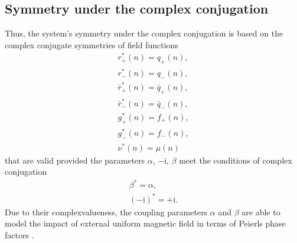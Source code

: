 \documentclass[10pt,a4paper]{amsart}
\numberwithin{equation}{section}
\begin{document}
\subsection{Symmetry under the complex conjugation}
Thus, the system's symmetry under the complex conjugation is based on the complex conjugate symmetries of field functions
\begin{gather}\label{eq-6.15}
	 r^{*}_{+}(n)=q_{+}(n),
\\ \label{eq-6.16}
	 r^{*}_{-}(n)=q_{-}(n),
\\ \label{eq-6.17}
	 \bar{r}^{*}_{+}(n)=\bar{q}_{+}(n),
\\ \label{eq-6.18}
	 \bar{r}^{*}_{-}(n)=\bar{q}_{-}(n),
\\ \label{eq-6.19}
	 g^{*}_{+}(n)=f_{+}(n),
\\ \label{eq-6.20}
	 g^{*}_{-}(n)=f_{-}(n),
\\ \label{eq-6.21}
	\nu^{*}(n)=\mu(n)
\end{gather}
that are valid provided the parameters $\alpha$, $-\mathrm{i}$, $\beta$
meet the conditions of complex conjugation{\samepage
\begin{gather}\label{eq-6.22}
	 \beta^{*}=\alpha,
\\ \label{eq-6.23}
	(-\mathrm{i})^{*}=+\mathrm{i} .
\end{gather}}%
Due to their complexvalueness, the coupling parameters $\alpha$ and $\beta$ are able to model the impact of external uniform magnetic field in terms of Peierls phase factors \cite{feynman-FLP3-1963, peierls-ZPh-80-763, vakhnenko-PRE-77-026604}.
\end{document}
